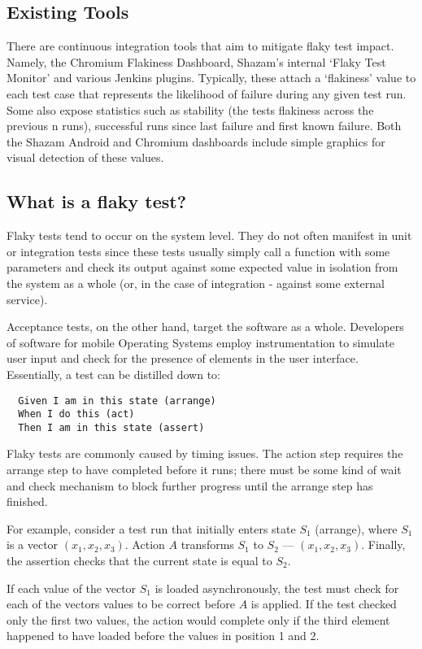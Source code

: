 \subsection{Existing Tools}

There are continuous integration tools that aim to mitigate flaky test impact. Namely, the Chromium Flakiness Dashboard, Shazam’s internal ‘Flaky Test Monitor’ and various Jenkins plugins. Typically, these attach a ‘flakiness’ value to each test case that represents the likelihood of failure during any given test run. Some also expose statistics such as stability (the tests flakiness across the previous n runs), successful runs since last failure and first known failure. Both the Shazam Android and Chromium dashboards include simple graphics for visual detection of these values.

\subsection{What is a flaky test?}
Flaky tests tend to occur on the system level. They do not often manifest in unit or integration tests since these tests usually simply call a function with some parameters and check its output against some expected value in isolation from the system as a whole (or, in the case of integration - against some external service).

Acceptance tests, on the other hand, target the software as a whole. Developers of software for mobile Operating Systems employ instrumentation to simulate user input and check for the presence of elements in the user interface. Essentially, a test can be distilled down to:
\begin{verbatim}
  Given I am in this state (arrange)
  When I do this (act)
  Then I am in this state (assert)
\end{verbatim}

Flaky tests are commonly caused by timing issues. The action step requires the arrange step to have completed before it runs; there must be some kind of wait and check mechanism to block further progress until the arrange step has finished.

For example, consider a test run that initially enters state $S_{1}$ (arrange), where $S_{1}$ is a vector $(x_{1},x_{2},x_{3})$. Action $A$ transforms $S_1$ to $S_2$ --- $(x_{1},x_{2},x_{3})$. Finally, the assertion checks that the current state is equal to $S_2$.

If each value of the vector $S_{1}$ is loaded asynchronously, the test must check for each of the vectors values to be correct before $A$ is applied. If the test checked only the first two values, the action would complete only if the third element happened to have loaded before the values in position 1 and 2.

